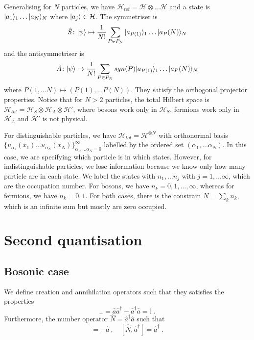     Generalising for $N$ particles, we have $\mathcal H_{tot} = \mathcal H \otimes \ldots \mathcal H$ and a state is $\vert a_1\rangle_1 \ldots \vert a_N\rangle_N$ where $\vert a_j\rangle \in \mathcal H$. The symmetriser is 
    \begin{equation*}
        \hat S \colon \vert\psi\rangle \mapsto \frac{1}{N!} \sum_{P \in P_N} \vert a_{P(1)}\rangle_1 \ldots \vert a_P(N)\rangle_N
    \end{equation*}
    and the antisymmetriser is 
    \begin{equation*}
        \hat A \colon \vert\psi\rangle \mapsto \frac{1}{N!} \sum_{P \in P_N} sgn(P) \vert a_{P(1)}\rangle_1 \ldots \vert a_P(N)\rangle_N
    \end{equation*}
    where $P(1, \ldots N) \mapsto (P(1), \ldots P(N))$. They satisfy the orthogonal projector properties. Notice that for $N > 2$ particles, the total Hilbert space is $\mathcal H_{tot} = \mathcal H_S \otimes \mathcal H_A \otimes \mathcal H'$, where bosons work only in $\mathcal H_S$, fermions work only in $\mathcal H_A$ and $\mathcal H'$ is not physical.

    For distinguishable particles, we have $\mathcal H_{tot} = \mathcal H^{\otimes N}$ with orthonormal basis $\{u_{\alpha_1}(x_1) \ldots u_{\alpha_N}(x_N)\}_{\alpha_1, \ldots \alpha_N=0}^\infty$ labelled by the ordered set $(\alpha_1, \ldots \alpha_N)$. In this case, we are specifying which particle is in which states. However, for indistinguishable particles, we lose information because we know only how many particle are in each state. We label the states with $n_1, \ldots n_j$ with $j=1, \ldots \infty$, which are the occupation number. For bosons, we have $n_k = 0, 1, \ldots, \infty$, whereas for fermions, we have $n_k = 0, 1$. For both cases, there is the constrain $N = \sum_k n_k$, which is an infinite sum but mostly are zero occupied.

\chapter{Second quantisation} 

\section{Bosonic case}

    We define creation and annihilation operators such that they satisfies the properties 
    \begin{equation*}
        [\hat a, \hat a^\dagger]_- = \hat a \hat a^\dagger - \hat a^\dagger \hat a = \mathbb I~.
    \end{equation*}
    Furthermore, the number operator $\hat N = \hat a^\dagger \hat a$ such that 
    \begin{equation*}
        [\hat N, \hat a] = - \hat a~, \quad [\hat N, \hat a^\dagger] = \hat a^\dagger ~.
    \end{equation*} 

